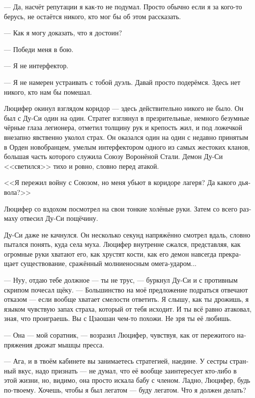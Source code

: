 \documentclass[a4paper,12pt,fleqn]{book}\usepackage{polyglossia}\setdefaultlanguage[babelshorthands=true]{russian}\setotherlanguage{english}\defaultfontfeatures{Ligatures=TeX,Mapping=tex-text}\usepackage{xcolor}\newcommand{\ml}[3]{#2}
\begin{document}
{--- Да, насчёт репутации я как-то не подумал.
Просто обычно если я за кого-то берусь, не остаётся никого, кто мог бы об этом рассказать.

--- Как я могу доказать, что я достоин?

--- Победи меня в бою.

--- Я не интерфектор.

--- Я не намерен устраивать с тобой дуэль.
Давай просто подерёмся.
Здесь нет никого, кто нам бы помешал.

Люцифер окинул взглядом коридор --- здесь действительно никого не было.
Он был с Ду-Си один на один.
Стратег взглянул в презрительные, немного безумные чёрные глаза легионера, отметил толщину рук и крепость жил, и под ложечкой внезапно явственно уколол страх.
Он оказался один на один с недавно принятым в Орден новобранцем, умелым интерфектором одного из самых жестоких кланов, большая часть которого служила Союзу Воронёной Стали.
Демон Ду-Си <<светился>> тихо и ровно, словно перед атакой.

<<Я пережил войну с Союзом, но меня убьют в коридоре лагеря?
Да какого дьявола?>>

Люцифер со вздохом посмотрел на свои тонкие холёные руки.
Затем со всего размаху отвесил Ду-Си пощёчину.

Ду-Си даже не качнулся.
Он несколько секунд напряжённо смотрел вдаль, словно пытался понять, куда села муха.
Люцифер внутренне сжался, представляя, как огромные руки хватают его, как хрустят кости, как его демон навсегда прекращает существование, сражённый молниеносным омега-ударом...

--- Нуу, отдаю тебе должное --- ты не трус, --- буркнул Ду-Си и с противным скрипом почесал щёку.
--- Большинство на моё предложение подраться отвечают отказом --- если вообще хватает смелости ответить.
Я слышу, как ты дрожишь, я языком чувствую запах страха, который от тебя исходит.
И ты всё равно атаковал, зная, что проиграешь.
Вы с Цзаошан чем-то похожи.
Не зря ты её любишь.

--- Она --- мой соратник, --- возразил Люцифер, чувствуя, как от пережитого напряжения дрожат мышцы пресса.

--- Ага, и в твоём кабинете вы занимаетесь стратегией, наедине.
У сестры странный вкус, надо признать --- не думал, что её вообще заинтересует кто-либо в этой жизни, но, видимо, она просто искала бабу с членом.
Ладно, Люцифер, будь по-твоему.
Хочешь, чтобы я был легатом --- буду легатом.
\ml{$0$}
{Что я должен делать?}
{What I am to do?''}

}
\end{document}
